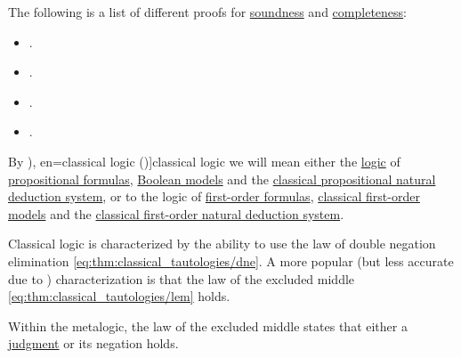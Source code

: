 \begin{remark}\label{rem:soundness_and_completeness_theorem_list}
  The following is a list of different proofs for \hyperref[def:abstract_logic/soundness]{soundness} and \hyperref[def:abstract_logic/completeness]{completeness}:
  \begin{itemize}
    \item {}.
    \item {}.
    \item {}.
    \item {}.
  \end{itemize}
\end{remark}

\begin{concept}\label{con:classical_logic}\mimprovised
  By \term[ru=классическая логика (\cite[58]{ШеньВерещагин2017ЯзыкиИИсчисления}), en=classical logic (\cite[8]{TroelstraSchwichtenberg2000BasicProofTheory})]{classical logic} we will mean either the \hyperref[def:abstract_logic]{logic} of \hyperref[def:propositional_syntax/formula]{propositional formulas}, \hyperref[def:propositional_semantics/classical]{Boolean models} and the \hyperref[def:propositional_natural_deduction_systems]{classical propositional natural deduction system}, or to the logic of \hyperref[def:first_order_syntax/formula]{first-order formulas}, \hyperref[def:first_order_model]{classical first-order models} and the \hyperref[def:first_order_natural_deduction_system]{classical first-order natural deduction system}.
\end{concept}
\begin{comments}
  \item Classical logic is characterized by the ability to use the law of double negation elimination \eqref{eq:thm:classical_tautologies/dne}. A more popular (but less accurate due to ) characterization is that the law of the excluded middle \eqref{eq:thm:classical_tautologies/lem} holds.
  \item Within the metalogic, the law of the excluded middle states that either a \hyperref[con:judgment]{judgment} or its negation holds.
\end{comments}

